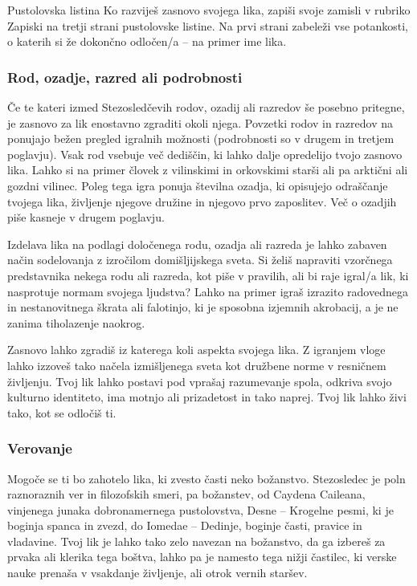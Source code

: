 \begin{rpg-titlebox}{Pustolovska listina}
    Ko razviješ zasnovo svojega lika, zapiši svoje zamisli v rubriko Zapiski na tretji strani pustolovske listine. Na prvi strani zabeleži vse potankosti, o katerih si že dokončno odločen/a -- na primer ime lika.
\end{rpg-titlebox}

\subsubsection{Rod, ozadje, razred ali podrobnosti}
Če te kateri izmed Stezosledčevih rodov, ozadij ali razredov še posebno pritegne, je zasnovo za lik enostavno zgraditi okoli njega. Povzetki rodov in razredov na \pageref{sec:summaries} ponujajo bežen pregled igralnih možnosti (podrobnosti so v drugem in tretjem poglavju). Vsak rod vsebuje več dediščin, ki lahko dalje opredelijo tvojo zasnovo lika. Lahko si na primer človek z vilinskimi in orkovskimi starši ali pa arktični ali gozdni vilinec. Poleg tega igra ponuja številna ozadja, ki opisujejo odraščanje tvojega lika, življenje njegove družine in njegovo prvo zaposlitev. Več o ozadjih piše kasneje v drugem poglavju.

Izdelava lika na podlagi določenega rodu, ozadja ali razreda je lahko zabaven način sodelovanja z izročilom domišljijskega sveta. Si želiš napraviti vzorčnega predstavnika nekega rodu ali razreda, kot piše v pravilih, ali bi raje igral/a lik, ki nasprotuje normam svojega ljudstva? Lahko na primer igraš izrazito radovednega in nestanovitnega škrata ali falotinjo, ki je sposobna izjemnih akrobacij, a je ne zanima tiholazenje naokrog.

Zasnovo lahko zgradiš iz katerega koli aspekta svojega lika. Z igranjem vloge lahko izzoveš tako načela izmišljenega sveta kot družbene norme v resničnem življenju. Tvoj lik lahko postavi pod vprašaj razumevanje spola, odkriva svojo kulturno identiteto, ima motnjo ali prizadetost in tako naprej. Tvoj lik lahko živi tako, kot se odločiš ti.

\subsubsection{Verovanje}
Mogoče se ti bo zahotelo lika, ki zvesto časti neko božanstvo. Stezosledec je poln raznoraznih ver in filozofskih smeri, pa božanstev, od Caydena Caileana, vinjenega junaka dobronamernega pustolovstva, Desne -- Krogelne pesmi, ki je boginja spanca in zvezd, do Iomedae -- Dedinje, boginje časti, pravice in vladavine. Tvoj lik je lahko tako zelo navezan na božanstvo, da ga izbereš za prvaka ali klerika tega boštva, lahko pa je namesto tega nižji častilec, ki verske nauke prenaša v vsakdanje življenje, ali otrok vernih staršev.

